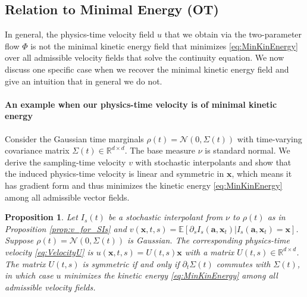 \documentclass{article}
\newcommand{\bfx}{\boldsymbol{x}}
\newcommand{\bfa}{\boldsymbol{a}}
\theoremstyle{definition}
\theoremstyle{plain}
\newtheorem{proposition}[theorem]{Proposition}
\theoremstyle{definition}
\theoremstyle{remark}
\begin{document}
\subsection{Relation to Minimal  Energy (OT)}\label{sec:OTDiscussion}
In general, the physics-time velocity field $u$ that we obtain via the two-parameter flow $\Phi$ is not the minimal kinetic energy field that minimizes \eqref{eq:MinKinEnergy} over all admissible velocity fields that solve the continuity equation. We now discuss one specific case when we recover the minimal kinetic energy field and give an intuition that in general we do not.

\paragraph{An example when our physics-time velocity is of minimal kinetic energy} Consider the Gaussian time marginals $\rho(t) =   \mathcal{N}(0, \Sigma(t))$ with time-varying covariance matrix $\Sigma(t) \in \mathbb{R}^{d \times d}$. The base measure $\nu$ is standard normal. We derive the sampling-time velocity $v$ with stochastic interpolants and show that the induced physics-time velocity is linear and symmetric in $\bfx$, which means it has gradient form and thus minimizes the kinetic energy \eqref{eq:MinKinEnergy} among all admissible vector fields.

\begin{proposition}\label{prop:OT:ExplicitUV}
     Let $I_s(t)$ be a stochastic interpolant from $\nu$ to $\rho(t)$ as in Proposition \ref{prop:v_for_SIs} and $v(\bfx, t, s) = \mathbb{E}[\partial_s I_s(\bfa, \bfx_t) | I_s(\bfa, \bfx_t) = \bfx]$. Suppose $\rho(t) = \mathcal N(0, \Sigma(t))$ is Gaussian. The corresponding physics-time velocity \eqref{eq:VelocityU} is $u(\bfx, t, s) = U(t, s)\bfx$ with a matrix $U(t, s) \in \mathbb{R}^{d \times d}$.  The matrix $U(t, s)$ is symmetric if and only if $\partial_t \Sigma(t)$ commutes with $\Sigma(t)$, in which  case $u$ minimizes the  kinetic energy \eqref{eq:MinKinEnergy} among all admissible velocity fields. 
    
\end{proposition}
\end{document}
